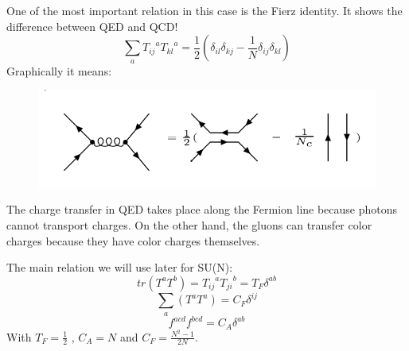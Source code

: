 One of the most important relation in this case is the Fierz identity. It shows the difference between QED and QCD!
\begin{equation}
\displaystyle\sum\limits_{a} {T_{ij}}^a {T_{kl}}^a = \frac{1}{2}(\delta_{il}\delta_{kj}-\frac{1}{N}\delta_{ij}\delta_{kl})
\end{equation}
Graphically it means:
\begin{figure}[h!]
\centering
\includegraphics[scale=0.6]{images/Intro/Fritz.png}
\end{figure}
The charge transfer in QED takes place along the Fermion line because photons cannot transport charges. On the other hand, the gluons can transfer color charges because they have color charges themselves.  

The main relation we will use later for SU(N):
\begin{equation}
tr(T^a T^b)= {T_{ij}}^a {T_{ji}}^b = T_F \delta^{ab}
\end{equation}
\begin{equation}
\displaystyle\sum\limits_{a} (T^a T^a) = C_F \delta^{ij}
\end{equation}
\begin{equation}
f^{acd} f^{bcd} = C_A \delta^{ab}
\end{equation}
With $  T_F = \frac{1}{2} $ , $ C_A = N $ and $ C_F = \frac{N^2 -1}{2N} $.



\newpage